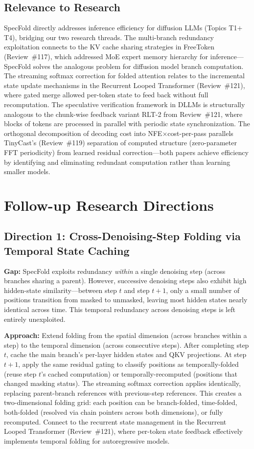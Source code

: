 \documentclass[11pt,a4paper]{article}
\begin{document}
\subsection{Relevance to Research}
SpecFold directly addresses inference efficiency for diffusion LLMs (Topics T1$+$T4), bridging our two research threads. The multi-branch redundancy exploitation connects to the KV cache sharing strategies in FreeToken (Review~\#117), which addressed MoE expert memory hierarchy for inference---SpecFold solves the analogous problem for diffusion model branch computation. The streaming softmax correction for folded attention relates to the incremental state update mechanisms in the Recurrent Looped Transformer (Review~\#121), where gated merge allowed per-token state to feed back without full recomputation. The speculative verification framework in DLLMs is structurally analogous to the chunk-wise feedback variant RLT-2 from Review~\#121, where blocks of tokens are processed in parallel with periodic state synchronization. The orthogonal decomposition of decoding cost into NFE$\times$cost-per-pass parallels TinyCast's (Review~\#119) separation of computed structure (zero-parameter FFT periodicity) from learned residual correction---both papers achieve efficiency by identifying and eliminating redundant computation rather than learning smaller models.

\section{Follow-up Research Directions}

\subsection{Direction 1: Cross-Denoising-Step Folding via Temporal State Caching}
\textbf{Gap:} SpecFold exploits redundancy \emph{within} a single denoising step (across branches sharing a parent). However, successive denoising steps also exhibit high hidden-state similarity---between step $t$ and step $t{+}1$, only a small number of positions transition from masked to unmasked, leaving most hidden states nearly identical across time. This temporal redundancy across denoising steps is left entirely unexploited.

\textbf{Approach:} Extend folding from the spatial dimension (across branches within a step) to the temporal dimension (across consecutive steps). After completing step $t$, cache the main branch's per-layer hidden states and QKV projections. At step $t{+}1$, apply the same residual gating to classify positions as temporally-folded (reuse step $t$'s cached computation) or temporally-recomputed (positions that changed masking status). The streaming softmax correction applies identically, replacing parent-branch references with previous-step references. This creates a two-dimensional folding grid: each position can be branch-folded, time-folded, both-folded (resolved via chain pointers across both dimensions), or fully recomputed. Connect to the recurrent state management in the Recurrent Looped Transformer (Review~\#121), where per-token state feedback effectively implements temporal folding for autoregressive models.
\end{document}
